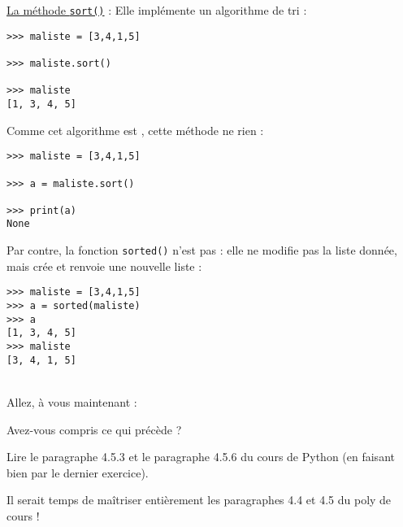 \begin{enonce}
\nipuce  \ul{La méthode \texttt{sort()}} : Elle implémente un algorithme de tri  :
\begin{verbatim}
>>> maliste = [3,4,1,5]

>>> maliste.sort()

>>> maliste
[1, 3, 4, 5]
\end{verbatim}

Comme cet algorithme est , cette méthode ne  rien :
\begin{verbatim}
>>> maliste = [3,4,1,5]

>>> a = maliste.sort()

>>> print(a)
None
\end{verbatim}






\nipuce  Par contre, la fonction \texttt{sorted()} n'est pas  : elle ne modifie pas la liste donnée, mais crée et renvoie une nouvelle liste :
\begin{verbatim}
>>> maliste = [3,4,1,5]
>>> a = sorted(maliste)
>>> a
[1, 3, 4, 5]
>>> maliste
[3, 4, 1, 5]
\end{verbatim}


\\

Allez, à vous maintenant :

\ques Avez-vous compris ce qui précède ?

\ques  Lire le paragraphe 4.5.3  et le paragraphe 4.5.6 du cours de Python (en faisant bien par le dernier exercice).




\end{enonce}

\begin{correction}

\end{correction}


\begin{enonce}

Il serait temps de maîtriser entièrement les paragraphes 4.4 et 4.5 du poly de cours ! 


\end{enonce}


\begin{correction}

\end{correction}
